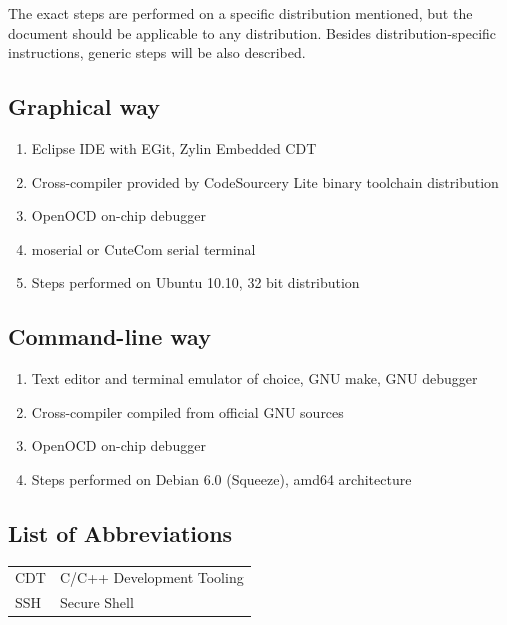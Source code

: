 \documentclass[a4paper, 10pt]{article}
\begin{document}
The exact steps are performed on a specific distribution mentioned, but the
document should be applicable to any distribution. Besides distribution-specific
instructions, generic steps will be also described.

\subsection{Graphical way}

\begin{enumerate}
\item Eclipse IDE with EGit, Zylin Embedded CDT
\item Cross-compiler provided by CodeSourcery Lite binary toolchain
	distribution
\item OpenOCD on-chip debugger
\item moserial or CuteCom serial terminal
\item Steps performed on Ubuntu 10.10, 32 bit distribution
\end{enumerate}

\subsection{Command-line way}

\begin{enumerate}
\item Text editor and terminal emulator of choice, GNU make, GNU debugger
\item Cross-compiler compiled from official GNU sources
\item OpenOCD on-chip debugger
\item Steps performed on Debian 6.0 (Squeeze), amd64 architecture
\end{enumerate}

\newpage

\tableofcontents
\newpage

\listoffigures
\newpage

\subsection*{List of Abbreviations}
	\begin{tabular}{ l l }
    CDT	    & C/C++ Development Tooling \\
	SSH		& Secure Shell \\
	\end{tabular}
\newpage
\end{document}
